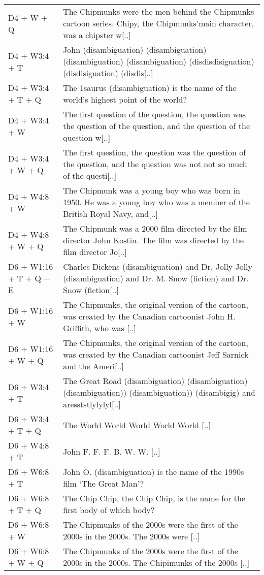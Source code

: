 {\begin{longtable}{@{}l p{\dimexpr\textwidth-3cm-4\tabcolsep}@{}}
D4 + W + Q & The Chipmunks were the men behind the Chipmunks cartoon series. Chipy, the Chipmunks'main character, was a chipster w[..] \\
D4 + W3:4 + T & John (disambiguation) (disambiguation) (disambiguation) (disambiguation) (disdisdisiguation) (disdisiguation) (disdis[..] \\
D4 + W3:4 + T + Q & The 1saurus (disambiguation) is the name of the world's highest point of the world? \\
D4 + W3:4 + W & The first question of the question, the question was the question of the question, and the question of the question w[..] \\
D4 + W3:4 + W + Q & The first question, the question was the question of the question, and the question was not not so much of the questi[..] \\
D4 + W4:8 + W & The Chipmunk was a young boy who was born in 1950. He was a young boy who was a member of the British Royal Navy, and[..] \\
D4 + W4:8 + W + Q & The Chipmunk was a 2000 film directed by the film director John Kostin. The film was directed by the film director Jo[..] \\
D6 + W1:16 + T + Q + E & Charles Dickens (disambiguation) and Dr. Jolly Jolly (disambiguation) and Dr. M. Snow (fiction) and Dr. Snow (fiction[..] \\
D6 + W1:16 + W & The Chipmunks, the original version of the cartoon, was created by the Canadian cartoonist John H. Griffith, who was [..] \\
D6 + W1:16 + W + Q & The Chipmunks, the original version of the cartoon, was created by the Canadian cartoonist Jeff Sarnick and the Ameri[..] \\
D6 + W3:4 + T & The Great Road (disambiguation) (disambiguation) (disambiguation)) (disambiguation)) (disambigig) and aresststlylylyl[..] \\
D6 + W3:4 + T + Q & The World World World World World [..] \\
D6 + W4:8 + T & John F. F. F. B. W. W. [..] \\
D6 + W6:8 + T & John O. (disambiguation) is the name of the 1990s film ‘The Great Man’? \\
D6 + W6:8 + T + Q & The Chip Chip, the Chip Chip, is the name for the first body of which body? \\
D6 + W6:8 + W & The Chipmunks of the 2000s were the first of the 2000s in the 2000s. The 2000s were [..] \\
D6 + W6:8 + W + Q & The Chipmunks of the 2000s were the first of the 2000s in the 2000s. The Chipimunks of the 2000s [..] \\

\end{longtable}}
